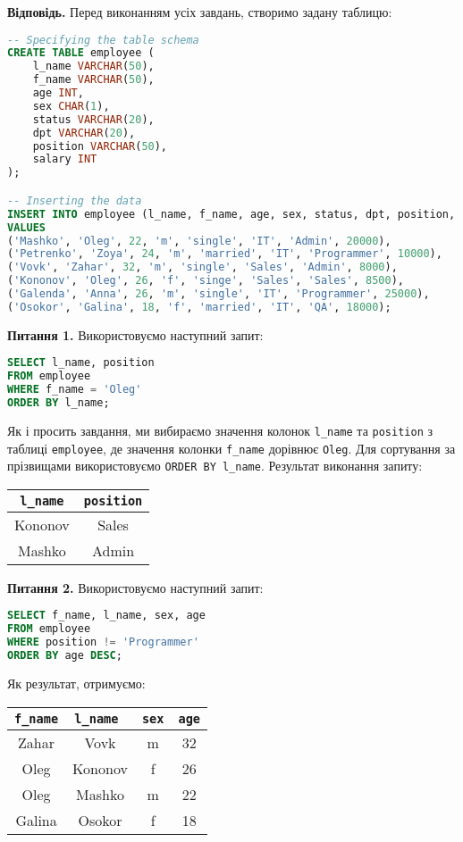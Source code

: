 \documentclass{hw_template}
\begin{document}
\textbf{Відповідь.} Перед виконанням усіх завдань, створимо задану таблицю:
\begin{lstlisting}[language=SQL]
-- Specifying the table schema
CREATE TABLE employee (
    l_name VARCHAR(50),
    f_name VARCHAR(50),
    age INT,
    sex CHAR(1),
    status VARCHAR(20),
    dpt VARCHAR(20),
    position VARCHAR(50),
    salary INT
);

-- Inserting the data
INSERT INTO employee (l_name, f_name, age, sex, status, dpt, position, salary)
VALUES
('Mashko', 'Oleg', 22, 'm', 'single', 'IT', 'Admin', 20000),
('Petrenko', 'Zoya', 24, 'm', 'married', 'IT', 'Programmer', 10000),
('Vovk', 'Zahar', 32, 'm', 'single', 'Sales', 'Admin', 8000),
('Kononov', 'Oleg', 26, 'f', 'singe', 'Sales', 'Sales', 8500),
('Galenda', 'Anna', 26, 'm', 'single', 'IT', 'Programmer', 25000),
('Osokor', 'Galina', 18, 'f', 'married', 'IT', 'QA', 18000);
\end{lstlisting}

\textbf{Питання 1.} Використовуємо наступний запит:
\begin{lstlisting}[language=SQL]
SELECT l_name, position
FROM employee
WHERE f_name = 'Oleg'
ORDER BY l_name;
\end{lstlisting}

Як і просить завдання, ми вибираємо значення колонок \texttt{l\_name} та \texttt{position} з таблиці \texttt{employee},
де значення колонки \texttt{f\_name} дорівнює \texttt{Oleg}. Для сортування за прізвищами використовуємо \texttt{ORDER BY l\_name}.
Результат виконання запиту:
\begin{table}[H]
    \centering
    \begin{tabular}{|c|c|}
        \hline
        \texttt{l\_name} & \texttt{position} \\
        \hline
        Kononov & Sales \\
        Mashko & Admin \\
        \hline
    \end{tabular}
\end{table}

\textbf{Питання 2.} Використовуємо наступний запит:
\begin{lstlisting}[language=SQL]
SELECT f_name, l_name, sex, age
FROM employee
WHERE position != 'Programmer'
ORDER BY age DESC;
\end{lstlisting}

Як результат, отримуємо:
\begin{table}[H]
    \centering
    \begin{tabular}{|c|c|c|c|}
        \hline
        \texttt{f\_name} & \texttt{l\_name
        } & 
        \texttt{sex} & \texttt{age} \\
        \hline
        Zahar   & Vovk       & m   & 32 \\
        Oleg     & Kononov    & f   & 26 \\
        Oleg     & Mashko     & m   & 22 \\
        Galina   & Osokor     & f   & 18 \\
        \hline
    \end{tabular}
\end{table}
\end{document}
